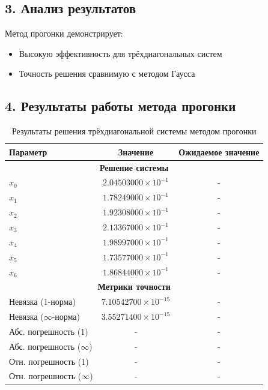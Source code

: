 \documentclass[12pt, a4paper]{article}
\begin{document}
\subsection*{3. Анализ результатов}

Метод прогонки демонстрирует:
\begin{itemize}
\item Высокую эффективность для трёхдиагональных систем
\item Точность решения сравнимую с методом Гаусса
\end{itemize}
\subsection*{4. Результаты работы метода прогонки}

\begin{table}[h]
\centering
\caption{Результаты решения трёхдиагональной системы методом прогонки}
\begin{tabular}{|l|c|c|}
\hline
\textbf{Параметр} & \textbf{Значение} & \textbf{Ожидаемое значение} \\
\hline
\multicolumn{3}{|c|}{\textbf{Решение системы}} \\
\hline
$x_0$ & $2.04503000 \times 10^{-1}$ & - \\
$x_1$ & $1.78249000 \times 10^{-1}$ & - \\
$x_2$ & $1.92308000 \times 10^{-1}$ & - \\
$x_3$ & $2.13367000 \times 10^{-1}$ & - \\
$x_4$ & $1.98997000 \times 10^{-1}$ & - \\
$x_5$ & $1.73577000 \times 10^{-1}$ & - \\
$x_6$ & $1.86844000 \times 10^{-1}$ & - \\
\hline
\multicolumn{3}{|c|}{\textbf{Метрики точности}} \\
\hline
Невязка (1-норма) & $7.10542700 \times 10^{-15}$ & - \\
Невязка ($\infty$-норма) & $3.55271400 \times 10^{-15}$ & - \\
Абс. погрешность (1) & - & - \\
Абс. погрешность ($\infty$) & - & - \\
Отн. погрешность (1) & - & - \\
Отн. погрешность ($\infty$) & - & - \\
\hline

\end{tabular}
\end{table}
\end{document}
